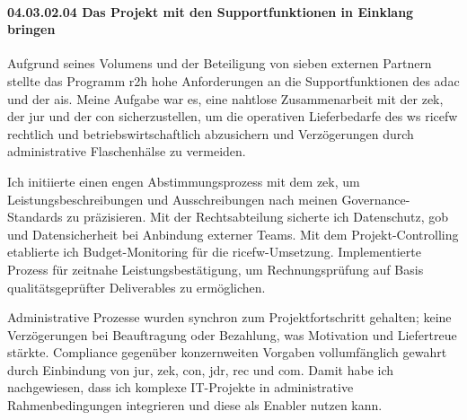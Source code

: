 \paragraph*{04.03.02.04 Das Projekt mit den Supportfunktionen in Einklang bringen}
\label{para:04.03.02.04_Supportfunktionen}

\par Aufgrund seines Volumens und der Beteiligung von sieben externen Partnern stellte das Programm \gls{r2h} hohe Anforderungen an die Supportfunktionen des \gls{adac} und der \gls{ais}. Meine Aufgabe war es, eine nahtlose Zusammenarbeit mit der \gls{zek}, der \gls{jur} und der \gls{con} sicherzustellen, um die operativen Lieferbedarfe des \gls{ws} \gls{ricefw} rechtlich und betriebswirtschaftlich abzusichern und Verzögerungen durch administrative Flaschenhälse zu vermeiden.

\par Ich initiierte einen engen Abstimmungsprozess mit dem \gls{zek}, um Leistungsbeschreibungen und Ausschreibungen nach meinen Governance-Standards zu präzisieren. Mit der Rechtsabteilung sicherte ich Datenschutz, \gls{gob} und Datensicherheit bei Anbindung externer Teams. Mit dem Projekt-Controlling etablierte ich Budget-Monitoring für die \gls{ricefw}-Umsetzung. Implementierte Prozess für zeitnahe Leistungsbestätigung, um Rechnungsprüfung auf Basis qualitätsgeprüfter Deliverables zu ermöglichen.

\par Administrative Prozesse wurden synchron zum Projektfortschritt gehalten; keine Verzögerungen bei Beauftragung oder Bezahlung, was Motivation und Liefertreue stärkte. Compliance gegenüber konzernweiten Vorgaben vollumfänglich gewahrt durch Einbindung von \gls{jur}, \gls{zek}, \gls{con}, \gls{jdr}, \gls{rec} und \gls{com}. Damit habe ich nachgewiesen, dass ich komplexe IT-Projekte in administrative Rahmenbedingungen integrieren und diese als Enabler nutzen kann.